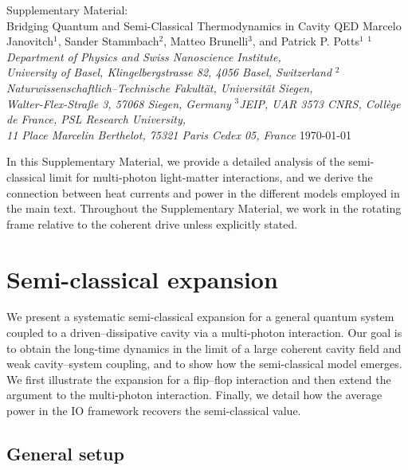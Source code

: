 \documentclass[aps,twocolumn,10pt,prl,floatfix,nofootinbib, superscriptaddress]{revtex4-2}
\begin{document}


\appendix
\pagebreak
\widetext

\newpage
\begin{center}
\vskip0.5cm
{\Large Supplementary Material:\\ Bridging Quantum and Semi-Classical Thermodynamics in Cavity QED}
\vskip0.1cm
{Marcelo Janovitch$^1$, Sander Stammbach$^2$, Matteo Brunelli$^3$, and Patrick P. Potts$^1$}
\vskip0.1cm
{$^1$\textit{Department of Physics and Swiss Nanoscience Institute,
	\\ University of Basel, Klingelbergstrasse 82, 4056 Basel,
Switzerland }}
\vskip0.1cm
{$^2$\textit{Naturwissenschaftlich–Technische Fakultät, Universität Siegen,
    \\ Walter-Flex-Straße 3, 57068 Siegen, Germany}}
\vskip0.1cm
{$^3$\textit{JEIP, UAR 3573 CNRS, Coll\`ege de France, PSL Research University,\\
11 Place Marcelin Berthelot, 75321 Paris Cedex 05, France}}
\vskip0.5cm
{\today}
\vskip0.2cm
\vskip0.1cm
\end{center}
\vskip0.4cm

\setcounter{equation}{0}
\setcounter{figure}{0}
\setcounter{table}{0}
\setcounter{page}{1}
\renewcommand{\theequation}{S\arabic{equation}}
\renewcommand{\thefigure}{S\arabic{figure}}

In this Supplementary Material, we provide a detailed analysis of the semi-classical limit for multi-photon light-matter interactions, and we derive the connection between heat currents and power in the different models employed in the main text. Throughout the Supplementary Material, we work in the rotating frame relative to the coherent drive unless explicitly stated.

\section{Semi-classical expansion}
We present a systematic semi-classical expansion for a general quantum system coupled to a driven--dissipative cavity via a multi-photon interaction.
Our goal is to obtain the long-time dynamics in the limit of a large coherent cavity field and weak cavity--system coupling, and to show how the semi-classical model emerges.
We first illustrate the expansion for a flip--flop interaction and then extend the argument to the multi-photon interaction.
Finally, we detail how the average power in the IO framework recovers the semi-classical value.
\subsection{General setup}
\end{document}
